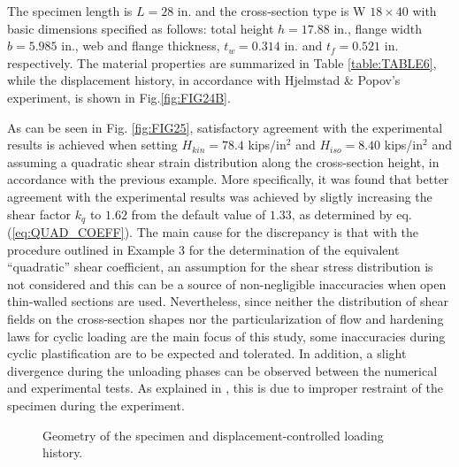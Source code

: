 The specimen length is $L=28$ in. and the cross-section type is W $18\times40$ 
with basic dimensions 
specified as follows: total height $h=17.88$ in., flange width $b=5.985$ in., 
web and flange thickness, $t_w=0.314$ in. and $t_f=0.521$ in. respectively. The 
material properties are summarized in Table \ref{table:TABLE6}, while the 
displacement history, in 
accordance with Hjelmstad \& Popov's experiment, is shown in 
Fig.\ref{fig:FIG24B}. 


 As can be seen in Fig. \ref{fig:FIG25}, satisfactory agreement with the 
 experimental results is achieved when setting 
$H_{kin}=78.4$ kips/in${}^2$ and $H_{iso} = 8.40$ kips/in${}^2$ and assuming 
a quadratic shear strain distribution along the cross-section height, in 
accordance with the previous example. More specifically, it was found that 
better agreement with the experimental results was achieved by sligtly 
increasing the shear factor $k_q$ to $1.62$ from the default value of $1.33$, 
as determined by eq. (\ref{eq:QUAD_COEFF}). The main cause for the discrepancy 
is that with the procedure outlined in Example 3 for the determination of the 
equivalent ``quadratic'' shear coefficient, an assumption for the shear stress 
distribution is not considered and this can be a source of non-negligible 
inaccuracies when open thin-walled sections are used. Nevertheless, since 
neither the distribution of shear fields on the cross-section shapes nor the 
particularization of flow and hardening laws for cyclic loading are the main 
focus of this study, some inaccuracies during cyclic plastification are to be 
expected and tolerated. In addition, a slight divergence during the unloading 
phases can be observed between the numerical and experimental tests. As 
explained in \cite{Saritas2009}, this is due to 
improper restraint of the specimen during the experiment.

\begin{figure}[t]
	\centering
	\caption{Geometry of the specimen and displacement-controlled loading 
		history.}
	\label{fig:FIG24}
\end{figure} 

